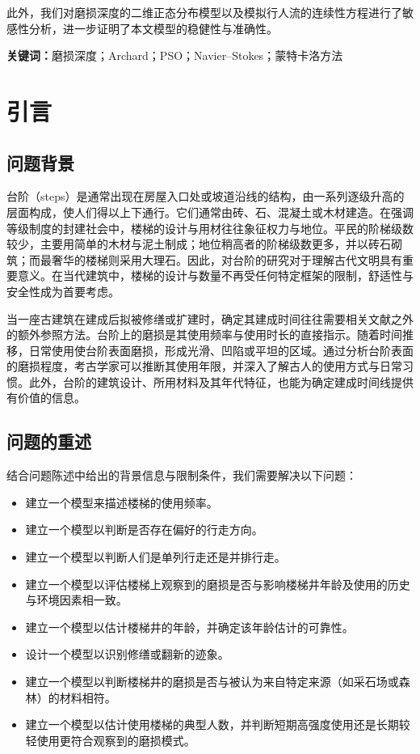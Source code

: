 \documentclass[11pt,a4paper]{ctexart}
\begin{document}
此外，我们对磨损深度的二维正态分布模型以及模拟行人流的连续性方程进行了敏感性分析，进一步证明了本文模型的稳健性与准确性。

\vspace{6pt}
\noindent\textbf{关键词：}磨损深度；Archard；PSO；Navier--Stokes；蒙特卡洛方法

\newpage
\pagestyle{fancy}

\section{引言}

\subsection{问题背景}

台阶（steps）是通常出现在房屋入口处或坡道沿线的结构，由一系列逐级升高的层面构成，使人们得以上下通行。它们通常由砖、石、混凝土或木材建造\cite{ref1}。在强调等级制度的封建社会中，楼梯的设计与用材往往象征权力与地位。平民的阶梯级数较少，主要用简单的木材与泥土制成；地位稍高者的阶梯级数更多，并以砖石砌筑；而最奢华的楼梯则采用大理石\cite{ref2}。因此，对台阶的研究对于理解古代文明具有重要意义。在当代建筑中，楼梯的设计与数量不再受任何特定框架的限制，舒适性与安全性成为首要考虑。

当一座古建筑在建成后拟被修缮或扩建时，确定其建成时间往往需要相关文献之外的额外参照方法。台阶上的磨损是其使用频率与使用时长的直接指示。随着时间推移，日常使用使台阶表面磨损，形成光滑、凹陷或平坦的区域。通过分析台阶表面的磨损程度，考古学家可以推断其使用年限，并深入了解古人的使用方式与日常习惯。此外，台阶的建筑设计、所用材料及其年代特征，也能为确定建成时间线提供有价值的信息。

\subsection{问题的重述}

结合问题陈述中给出的背景信息与限制条件，我们需要解决以下问题：

\begin{itemize}[leftmargin=2em,itemsep=2pt,topsep=2pt]
\item 建立一个模型来描述楼梯的使用频率。
\item 建立一个模型以判断是否存在偏好的行走方向。
\item 建立一个模型以判断人们是单列行走还是并排行走。
\item 建立一个模型以评估楼梯上观察到的磨损是否与影响楼梯井年龄及使用的历史与环境因素相一致。
\item 建立一个模型以估计楼梯井的年龄，并确定该年龄估计的可靠性。
\item 设计一个模型以识别修缮或翻新的迹象。
\item 建立一个模型以判断楼梯井的磨损是否与被认为来自特定来源（如采石场或森林）的材料相符。
\item 建立一个模型以估计使用楼梯的典型人数，并判断短期高强度使用还是长期较轻使用更符合观察到的磨损模式。
\end{itemize}
\end{document}
